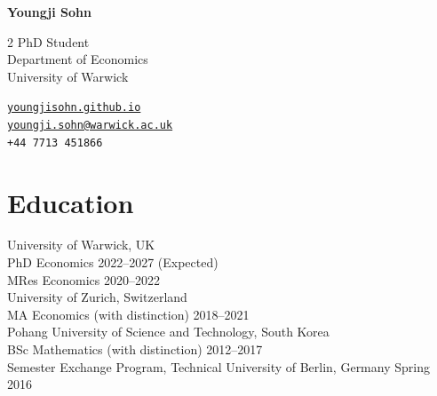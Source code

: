 \documentclass[11pt]{article}
\newlength{\oneli}
\begin{document}
{\bfseries \large Youngji Sohn}\\

\vspace{\oneli}

\setlength{\columnsep}{35pt}
\setlength\multicolsep{0pt}

\begin{multicols}{2}
PhD Student\\
\noindent Department of Economics\\
University of Warwick\par
\columnbreak
\raggedleft
\href{https://youngjisohn.github.io}{\texttt{youngjisohn.github.io}}\\
\href{mailto:youngji.sohn@warwick.ac.uk}{\texttt{youngji.sohn@warwick.ac.uk}}\\
\texttt{+44 7713 451866}\par
\end{multicols}

\section*{Education}
{University of Warwick}, UK\\
PhD Economics \hfill 2022--2027 (Expected)\\
MRes Economics \hfill 2020--2022\\[\oneli]
{University of Zurich}, Switzerland\\
MA Economics (with distinction) \hfill 2018--2021\\[\oneli]
{Pohang University of Science and Technology}, South Korea\\
BSc Mathematics (with distinction) \hfill 2012--2017\\
Semester Exchange Program, Technical University of Berlin, Germany \hfill Spring 2016
\end{document}
